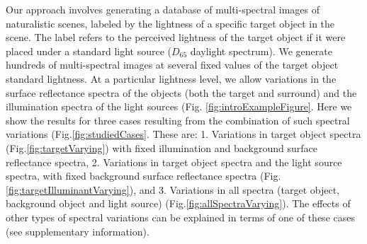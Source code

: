 \documentclass{jov}
\begin{document}

Our approach involves generating a database of multi-spectral images of naturalistic scenes, labeled by the lightness of a specific target object in the scene. The label refers to the perceived lightness of the target object if it were placed under a standard light source ($D_{65}$ daylight spectrum). We generate hundreds of multi-spectral images at several fixed values of the target object standard lightness. At a particular lightness level, we allow variations in the surface reflectance spectra of the objects (both the target and surround) and the illumination spectra of the light sources (Fig. \ref{fig:introExampleFigure}. Here we show the results for three cases resulting from the combination of such spectral variations (Fig.\ref{fig:studiedCases}. These are: 1. Variations in target object spectra (Fig.\ref{fig:targetVarying}) with fixed illumination and background surface reflectance spectra, 2. Variations in target object spectra and the light source spectra, with fixed background surface reflectance spectra (Fig.\ref{fig:targetIlluminantVarying}), and 3. Variations in all spectra (target object, background object and light source) (Fig.\ref{fig:allSpectraVarying}). The effects of other types of spectral variations can be explained in terms of one of these cases (see supplementary information).
\end{document}
